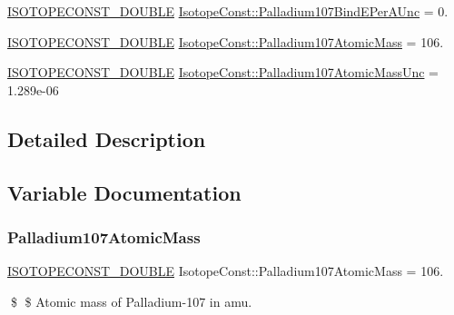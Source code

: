 \begin{DoxyCompactItemize}
\mbox{\hyperlink{group___isotope_const-_macros_ga8f45a7272ce02c0b4c65c44636ed719a}{I\+S\+O\+T\+O\+P\+E\+C\+O\+N\+S\+T\+\_\+\+D\+O\+U\+B\+LE}} \mbox{\hyperlink{group___isotope_const-_palladium-_pd107_gac338fe8d03409168a4359b4ca9690f3a}{Isotope\+Const\+::\+Palladium107\+Bind\+E\+Per\+A\+Unc}} = 0.
\item 
\mbox{\hyperlink{group___isotope_const-_macros_ga8f45a7272ce02c0b4c65c44636ed719a}{I\+S\+O\+T\+O\+P\+E\+C\+O\+N\+S\+T\+\_\+\+D\+O\+U\+B\+LE}} \mbox{\hyperlink{group___isotope_const-_palladium-_pd107_gab519dc51b53686140f7ebac90bb5d114}{Isotope\+Const\+::\+Palladium107\+Atomic\+Mass}} = 106.
\item 
\mbox{\hyperlink{group___isotope_const-_macros_ga8f45a7272ce02c0b4c65c44636ed719a}{I\+S\+O\+T\+O\+P\+E\+C\+O\+N\+S\+T\+\_\+\+D\+O\+U\+B\+LE}} \mbox{\hyperlink{group___isotope_const-_palladium-_pd107_gafd2bdc708bb1f5b9df898115447a4d3f}{Isotope\+Const\+::\+Palladium107\+Atomic\+Mass\+Unc}} = 1.\+289e-\/06
\end{DoxyCompactItemize}


\subsection{Detailed Description}


\subsection{Variable Documentation}
\mbox{\label{group___isotope_const-_palladium-_pd107_gab519dc51b53686140f7ebac90bb5d114}} 
\subsubsection{\texorpdfstring{Palladium107\+Atomic\+Mass}{Palladium107AtomicMass}}
{\footnotesize\ttfamily \mbox{\hyperlink{group___isotope_const-_macros_ga8f45a7272ce02c0b4c65c44636ed719a}{I\+S\+O\+T\+O\+P\+E\+C\+O\+N\+S\+T\+\_\+\+D\+O\+U\+B\+LE}} Isotope\+Const\+::\+Palladium107\+Atomic\+Mass = 106.}

\$ \$ Atomic mass of Palladium-\/107 in amu. \mbox{\label{group___isotope_const-_palladium-_pd107_gafd2bdc708bb1f5b9df898115447a4d3f}} 
